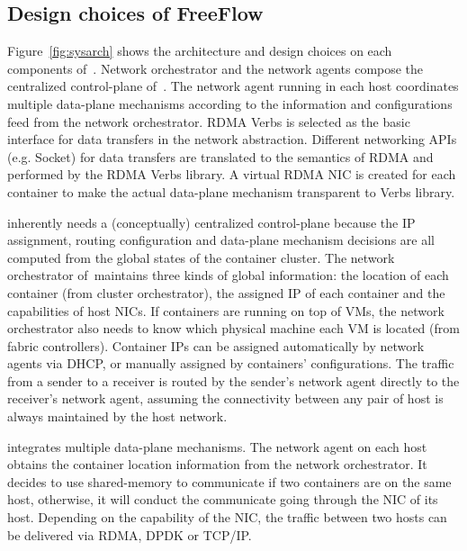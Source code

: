 \subsection{Design choices of FreeFlow}

Figure~\ref{fig:sysarch} shows the architecture and design choices on each 
components of~\sysname. Network orchestrator and the network agents compose 
the centralized control-plane of~\sysname. The network agent running in each 
host coordinates multiple data-plane mechanisms according to the information and 
configurations feed from the network orchestrator. RDMA Verbs is selected as 
the basic interface for data transfers in the network abstraction.  Different networking APIs (e.g. Socket) for data
transfers are translated to the semantics of RDMA and performed by the RDMA
Verbs library. A virtual RDMA NIC is created for each container to make the
actual data-plane mechanism transparent to Verbs library.

 \sysname inherently needs a (conceptually)
centralized control-plane because the IP assignment, routing configuration and 
data-plane mechanism decisions are all computed from the global states of the
container cluster. The network orchestrator of~\sysname maintains three kinds
of global information: the location of each container (from cluster orchestrator), the assigned IP of each
container and the capabilities of host NICs. If containers are running on top of
VMs, the network orchestrator also needs to know which physical machine each VM 
is located (from fabric controllers). Container IPs can be assigned 
automatically by network agents via DHCP, or manually assigned by containers' 
configurations. The traffic from a sender
to a receiver is routed by the sender's network agent directly to 
the receiver's network agent, assuming the connectivity between
any pair of host is always maintained by the host network. 

 \sysname integrates multiple data-plane 
mechanisms. The network agent on each host 
obtains the container location information from the network orchestrator. 
It decides to use shared-memory to communicate if two containers are on the
same host, otherwise, it will conduct the communicate going through 
the NIC of its host. Depending on the capability of the NIC, the traffic 
between two hosts can be delivered via RDMA, DPDK or TCP/IP.


